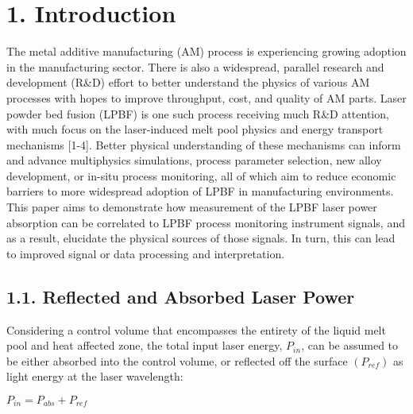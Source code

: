\documentclass[10pt]{article}
\begin{document}
\section*{1. Introduction}
The metal additive manufacturing (AM) process is experiencing growing adoption in the manufacturing sector. There is also a widespread, parallel research and development (R\&D) effort to better understand the physics of various AM processes with hopes to improve throughput, cost, and quality of AM parts. Laser powder bed fusion (LPBF) is one such process receiving much R\&D attention, with much focus on the laser-induced melt pool physics and energy transport mechanisms [1-4]. Better physical understanding of these mechanisms can inform and advance multiphysics simulations, process parameter selection, new alloy development, or in-situ process monitoring, all of which aim to reduce economic barriers to more widespread adoption of LPBF in manufacturing environments. This paper aims to demonstrate how measurement of the LPBF laser power absorption can be correlated to LPBF process monitoring instrument signals, and as a result, elucidate the physical sources of those signals. In turn, this can lead to improved signal or data processing and interpretation.

\subsection*{1.1. Reflected and Absorbed Laser Power}
Considering a control volume that encompasses the entirety of the liquid melt pool and heat affected zone, the total input laser energy, $P_{i n}$, can be assumed to be either absorbed into the control volume, or reflected off the surface $\left(P_{r e f}\right)$ as light energy at the laser wavelength:

$P_{i n}=P_{a b s}+P_{r e f}$
\end{document}
